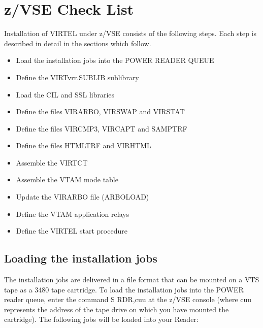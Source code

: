 \documentclass[letterpaper,10pt,english]{sphinxmanual}
\begin{document}
\section{z/VSE Check List}
\label{\detokenize{Installation_Guide:z-vse-check-list}}\label{\detokenize{Installation_Guide:index-17}}
\sphinxAtStartPar
Installation of VIRTEL under z/VSE consists of the following steps. Each step is described in detail in the sections which follow.
\begin{itemize}
\item {} 
\sphinxAtStartPar
Load the installation jobs into the POWER READER QUEUE

\item {} 
\sphinxAtStartPar
Define the VIRTvrr.SUBLIB sublibrary

\item {} 
\sphinxAtStartPar
Load the CIL and SSL libraries

\item {} 
\sphinxAtStartPar
Define the files VIRARBO, VIRSWAP and VIRSTAT

\item {} 
\sphinxAtStartPar
Define the files VIRCMP3, VIRCAPT and SAMPTRF

\item {} 
\sphinxAtStartPar
Define the files HTMLTRF and VIRHTML

\item {} 
\sphinxAtStartPar
Assemble the VIRTCT

\item {} 
\sphinxAtStartPar
Assemble the VTAM mode table

\item {} 
\sphinxAtStartPar
Update the VIRARBO file (ARBOLOAD)

\item {} 
\sphinxAtStartPar
Define the VTAM application relays

\item {} 
\sphinxAtStartPar
Define the VIRTEL start procedure

\end{itemize}

\ignorespaces 

\subsection{Loading the installation jobs}
\label{\detokenize{Installation_Guide:loading-the-installation-jobs}}\label{\detokenize{Installation_Guide:index-18}}
\sphinxAtStartPar
The installation jobs are delivered in a file format that can be mounted on a VTS tape as a 3480 tape cartridge. To load the installation jobs into the POWER reader queue, enter the command S RDR,cuu at the z/VSE console (where cuu represents the address of the tape drive on which you have mounted the cartridge). The following jobs will be loaded into your Reader:\sphinxhyphen{}
\end{document}
